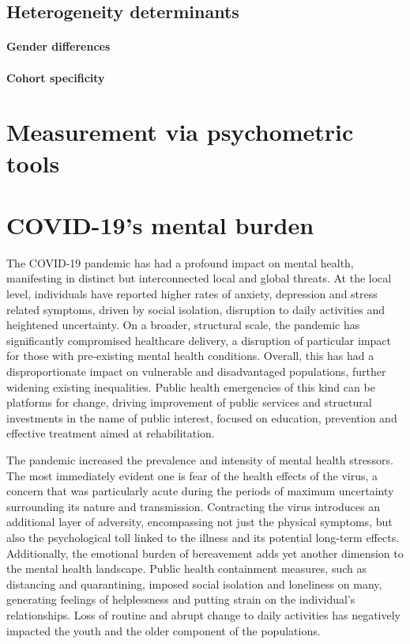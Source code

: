     


\subsection{Heterogeneity determinants}

\paragraph{Gender differences}

\paragraph{Cohort specificity}

\section{Measurement via psychometric tools}




\section{COVID-19's mental burden}
    The COVID-19 pandemic has had a profound impact on mental health, manifesting in distinct but interconnected local and global threats. At the local level, individuals have reported higher rates of anxiety, depression and stress related symptoms, driven by social isolation, disruption to daily activities and heightened uncertainty. On a broader, structural scale, the pandemic has significantly compromised healthcare delivery, a disruption of particular impact for those with pre-existing mental health conditions. Overall, this has had a disproportionate impact on vulnerable and disadvantaged populations, further widening existing inequalities. 
    Public health emergencies of this kind can be platforms for change, driving improvement of public services and structural investments in the name of public interest, focused on education, prevention and effective treatment aimed at rehabilitation. 

    The pandemic increased the prevalence and intensity of mental health stressors. The most immediately evident one is fear of the health effects of the virus, a concern that was particularly acute during the periods of maximum uncertainty surrounding its nature and transmission. Contracting the virus introduces an additional layer of adversity, encompassing not just the physical symptoms, but also the psychological toll linked to the illness and its potential long-term effects. Additionally, the emotional burden of bereavement adds yet another dimension to the mental health landscape.
    Public health containment measures, such as distancing and quarantining, imposed social isolation and loneliness on many, generating feelings of helplessness and putting strain on the individual's relationships. Loss of routine and abrupt change to daily activities has negatively impacted the youth and the older component of the populations. 

